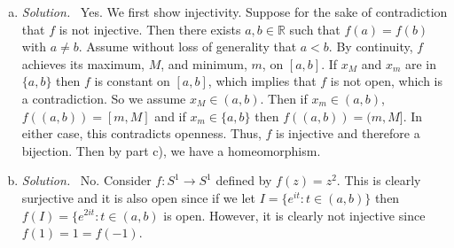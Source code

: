 \documentclass[12pt]{article}
\newcommand{\bbR}{\mathbb{R}}
\renewcommand{\_}[1]{\underline{ #1 }}
\theoremstyle{definition}
\newenvironment{exercise}[1]
  {\renewcommand\theinnercustomthm{#1}\innercustomthm}
  {\endinnercustomthm}
\newenvironment{solution}{\par\noindent\textit{Solution.}\ }{\par}
\numberwithin{equation}{subsection}
\begin{document}
\begin{exercise}{28}
\begin{enumerate} [(a)]
\begin{solution}
        \end{solution}
        \item \begin{solution}
            Yes. We first show injectivity. Suppose for the sake of contradiction that $f$ is not injective. Then there exists $a, b \in \bbR$ such that $f(a) = f(b)$ with $a \neq b$. Assume without loss of generality that $a < b$. By continuity, $f$ achieves its maximum, $M$, and minimum, $m$, on $[a, b]$. If $x_M$ and $x_m$ are in $\{ a, b \}$ then $f$ is constant on $[a, b]$, which implies that $f$ is not open, which is a contradiction. So we assume $x_M \in (a, b)$. Then if $x_m \in (a, b)$, $f((a, b)) = [m, M]$ and if $x_m \in \{ a, b \}$ then $f((a, b)) = (m, M]$. In either case, this contradicts openness. Thus, $f$ is injective and therefore a bijection. Then by part c), we have a homeomorphism. 
        \end{solution}
        \item \begin{solution}
            No. Consider $f: S^1 \to S^1$ defined by $f(z) = z^2$. This is clearly surjective and it is also open since if we let $I = \{ e^{it} : t \in (a, b) \}$ then $f(I) = \{ e^{2it} : t \in (a, b)$ is open. However, it is clearly not injective since $f(1) = 1 = f(-1)$. 
        \end{solution}
    \end{enumerate}
\end{exercise}
\end{document}
